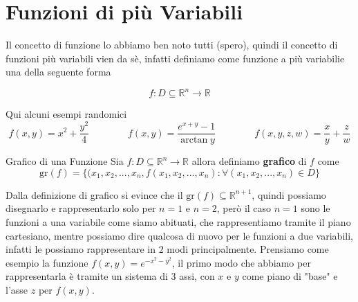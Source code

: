 \documentclass{rapport}
\begin{document}
\section{Funzioni di più Variabili}

Il concetto di funzione lo abbiamo ben noto tutti (spero), quindi il concetto di funzioni  più variabili vien da sè, infatti definiamo come funzione a più variabilie una della seguente forma

\[
f:D\subseteq \mathbb{R}^n \to \mathbb{R}
\]

Qui alcuni esempi randomici
\[
f(x,y) = x^2+\dfrac{y^2}{4} \qquad\qquad f(x,y) = \dfrac{e^{x+y}-1}{\arctan y} \qquad\qquad f(x,y,z,w) =\dfrac{x}{y} + \dfrac{z}{w}
\]

\begin{definizione}{Grafico di una Funzione}{}
  Sia $f:D\subseteq\mathbb{R}^n\to \mathbb{R}$ allora definiamo \textbf{grafico} di $f$ come 
  \[
  \text{gr}(f) = \{(x_1, x_2, ..., x_n, f(x_1, x_2, ..., x_n): \forall (x_1, x_2, ..., x_n) \in D\}
  \]
\end{definizione}


Dalla definizione di grafico si evince che il $\text{gr}(f) \subseteq \mathbb{R}^{n+1}$, quindi possiamo disegnarlo e rappresentarlo solo per $n=1$ e $n=2$, però il caso $n=1$ sono le funzioni a una variabile come siamo abituati, che rappresentiamo tramite il piano cartesiano, mentre possiamo dire qualcosa di nuovo per le funzioni a due variabili, infatti le possiamo rappresentare in 2 modi principalmente. Prensiamo come esempio la funzione $f(x,y)=e^{-x^2-y^2}$, il primo modo che abbiamo per rappresentarla è tramite un sistema di 3 assi, con $x$ e $y$ come piano di "base" e l'asse $z$ per $f(x,y)$. 
\vspace{-0.3cm}
\begin{center}
\end{center}
\end{document}
